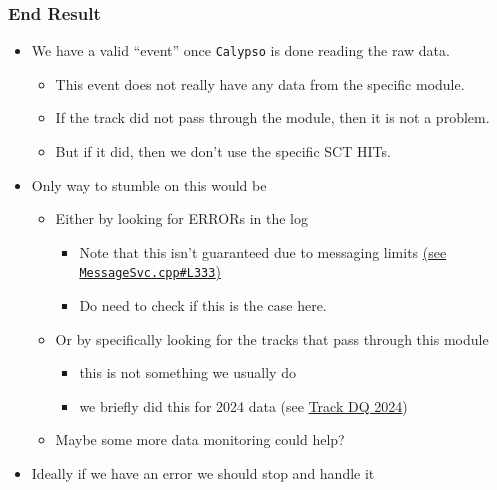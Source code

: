 \begin{frame}
    \frametitle{End Result}

    \begin{itemize}
        \item We have a valid ``event'' once \texttt{Calypso} is done reading the raw data.
              \begin{itemize}
                  \item This event does not really have any data from the specific module.
                  \item If the track did not pass through the module, then it is not a problem.
                  \item But if it did, then we don't use the specific SCT HITs.
              \end{itemize}
    \end{itemize}

    \begin{itemize}
        \item Only way to stumble on this would be
              \begin{itemize}
                  \item Either by looking for ERRORs in the log
                        \begin{itemize}
                            \item Note that this isn't guaranteed due to messaging limits \href{https://gitlab.cern.ch/atlas/Gaudi/-/blob/master/GaudiCoreSvc/src/MessageSvc/MessageSvc.cpp\#L333}{(see \texttt{MessageSvc.cpp\#L333})}
                            \item Do need to check if this is the case here.
                        \end{itemize}
                  \item Or by specifically looking for the tracks that pass through this module
                        \begin{itemize}
                            \item this is not something we usually do
                            \item we briefly did this for 2024 data (see \href{https://gitlab.cern.ch/papawan/Presentations/-/raw/main/DQFollowUp\_PPT\_detailed/build/TrackDQ\_2024\_Deltailed\_Pawan.pdf}{Track DQ 2024})
                        \end{itemize}
                  \item Maybe some more data monitoring could help?
              \end{itemize}
        \item Ideally if we have an error we should stop and handle it
    \end{itemize}

\end{frame}

